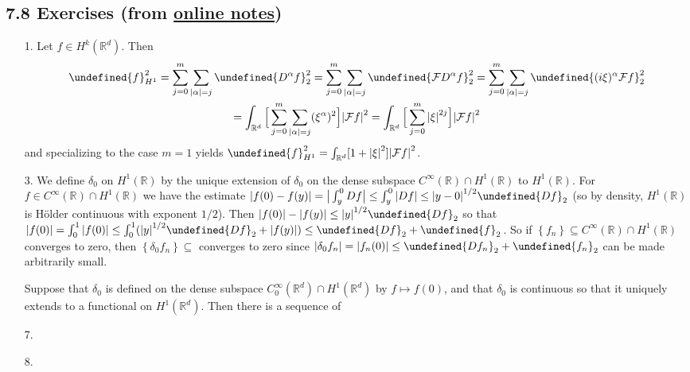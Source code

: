 \documentclass[11pt,leqno]{article}
\theoremstyle{plain}
\theoremstyle{definition}
\numberwithin{equation}{section}
\numberwithin{lem}{section}
\newcommand{\cbr}[1]{\left\{#1\right\}}
\let\norm\undefined %
\DeclarePairedDelimiter\norm{\lVert}{\rVert}
\begin{document}
\subsection*{7.8 Exercises (from \href{https://users.oden.utexas.edu/~arbogast/appMath08c.pdf}{online notes})}
\begin{enumerate}
    \item[1.] Let $f\in H^k(\mathbb R^d)$. Then 
    \begin{multline*}
        \norm{f}_{H^1}^2 = \sum_{j=0}^m\sum_{\abs{\alpha} = j}\norm{D^\alpha f}_2^2 = \sum_{j=0}^m\sum_{\abs{\alpha} = j}\norm{\mathcal FD^\alpha f}_2^2 = \sum_{j=0}^m\sum_{\abs{\alpha} = j}\norm{(i\xi)^\alpha \mathcal F f}_2^2 \\ = \int_{\mathbb R^d}\Big[\sum_{j=0}^m\sum_{\abs{\alpha} = j}(\xi^\alpha)^2\Big]\abs{\mathcal Ff}^2 = \int_{\mathbb R^d}\Big[\sum_{j=0}^m\abs{\xi}^{2j}\Big]\abs{\mathcal Ff}^2
    \end{multline*} and specializing to the case $m = 1$ yields $\norm{f}_{H^1}^2 = \int_{\mathbb R^d}[1+\abs{\xi}^{2}]\abs{\mathcal Ff}^2$.
    \item[3.] We define $\delta_0$ on $H^1(\mathbb R)$ by the unique extension of $\delta_0$ on the dense subspace $C^\infty(\mathbb R)\cap H^1(\mathbb R)$ to $H^1(\mathbb R)$. For $f\in C^\infty(\mathbb R)\cap H^1(\mathbb R)$ we have the estimate $\abs{f(0)-f(y)} = \big|\int_y^0Df\big|\leq \int_y^0\abs{Df}\leq \abs{y-0}^{1/2}\norm{Df}_2$ (so by density, $H^1(\mathbb R)$ is H\"older continuous with exponent $1/2$). Then $\abs{f(0)} - \abs{f(y)}\leq \abs{y}^{1/2}\norm{Df}_2$ so that $\abs{f(0)} = \int_0^1\abs{f(0)}\leq \int_0^1(\abs{y}^{1/2}\norm{Df}_2 + \abs{f(y)})\leq \norm{Df}_2 + \norm{f}_2$. So if $\cbr{f_n}\subseteq C^\infty(\mathbb R)\cap H^1(\mathbb R)$ converges to zero, then $\cbr{\delta_0f_n}\subseteq$ converges to zero since $\abs{\delta_0f_n} = \abs{f_n(0)}\leq \norm{Df_n}_2 + \norm{f_n}_2$ can be made arbitrarily small.
    
    Suppose that $\delta_0$ is defined on the dense subspace $C^\infty_0(\mathbb R^d)\cap H^1(\mathbb R^d)$ by $f\mapsto f(0)$, and that $\delta_0$ is continuous so that it uniquely extends to a functional on $H^1(\mathbb R^d)$. Then there is a sequence of 
    \item[7.] 
    \item[8.] 
\end{enumerate}
\end{document}
